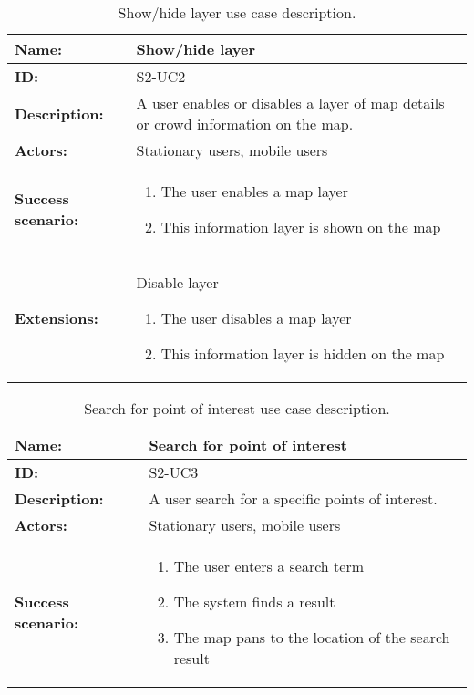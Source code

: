 \begin{table}[htbp]
    \centering
    \begin{tabularx}{\textwidth}{lX}
        \toprule
        \textbf{Name:}  & Show/hide layer \\ \midrule
        \textbf{ID:}    & S2-UC2 \\ \midrule
        \textbf{Description:} & A user enables or disables a layer of map details or crowd information on the map. \\ \midrule
        \textbf{Actors:} & Stationary users, mobile users \\ \midrule
        \textbf{Success scenario:} & 
        \begin{enumerate}
            \item The user enables a map layer
            \item This information layer is shown on the map
        \end{enumerate}
        \\ \midrule
        \textbf{Extensions:} & Disable layer 
        \begin{enumerate}
            \item The user disables a map layer
            \item This information layer is hidden on the map
        \end{enumerate}
        \\ \bottomrule
    \end{tabularx}
    \caption{Show/hide layer use case description.}
    \label{tab:s2-uc2}
\end{table}

\begin{table}[htbp]
    \centering
    \begin{tabularx}{\textwidth}{lX}
        \toprule
        \textbf{Name:}  & Search for point of interest \\ \midrule
        \textbf{ID:}    & S2-UC3 \\ \midrule
        \textbf{Description:} & A user search for a specific points of interest. \\ \midrule
        \textbf{Actors:} & Stationary users, mobile users \\ \midrule
        \textbf{Success scenario:} & 
        \begin{enumerate}
            \item The user enters a search term
            \item The system finds a result
            \item The map pans to the location of the search result
        \end{enumerate}
        \\ \bottomrule
    \end{tabularx}
    \caption{Search for point of interest use case description.}
    \label{tab:s2-uc3}
\end{table}


